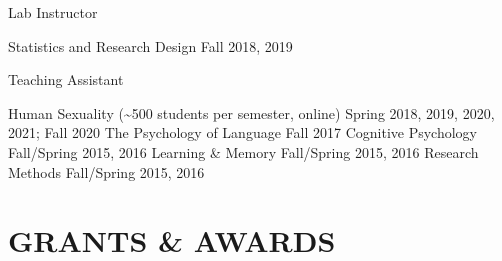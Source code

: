 \documentclass[10pt,]{article}
\begin{document}
\textcolor{light-gray}{Lab Instructor}

Statistics and Research Design
\hfill \textcolor{light-gray}{Fall 2018, 2019}

\textcolor{light-gray}{Teaching Assistant}

Human Sexuality (\textasciitilde500 students per semester, online)
\hfill \textcolor{light-gray}{Spring 2018, 2019, 2020, 2021; Fall 2020}
\newline The Psychology of Language
\hfill \textcolor{light-gray}{Fall 2017} \newline Cognitive Psychology
\hfill \textcolor{light-gray}{Fall/Spring 2015, 2016} \newline Learning
\& Memory \hfill \textcolor{light-gray}{Fall/Spring 2015, 2016} \newline
Research Methods \hfill \textcolor{light-gray}{Fall/Spring 2015, 2016}

\section{GRANTS \& AWARDS}\label{grants-awards}
\end{document}
